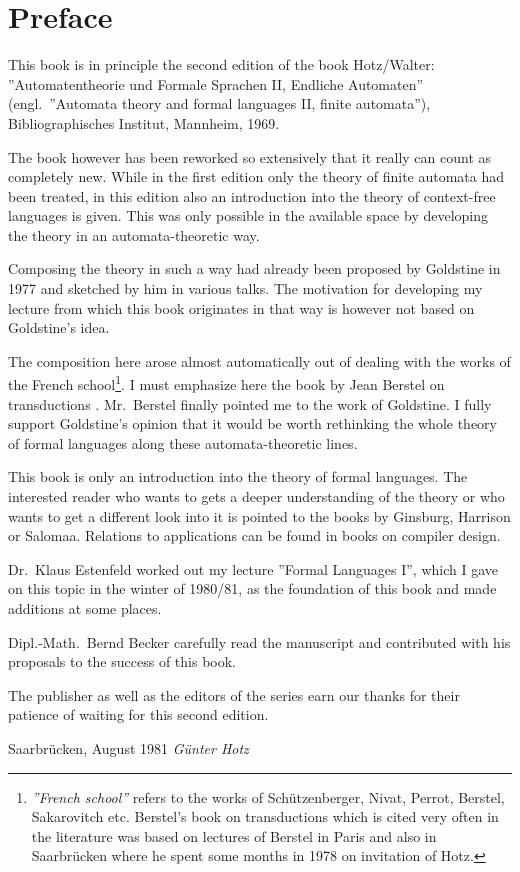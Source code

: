 \chapter*{Preface}

This book is in principle the second edition of the book Hotz/Walter:
''Automatentheorie und Formale Sprachen II, Endliche Automaten'' (engl.\
''Automata theory and formal languages II, finite automata''), Bibliographisches
Institut, Mannheim, 1969.

The book however has been reworked so extensively that it really can count as
completely new. While in the first edition only the theory of finite automata
had been treated, in this edition also an introduction into the theory of
context-free languages is given. This was only possible in the available space
by developing the theory in an automata-theoretic way.

Composing the theory in such a way had already been proposed by Goldstine in
1977 \cite{Goldstine77} and sketched by him in various talks. The motivation for
developing my lecture from which this book originates in that way is however not
based on Goldstine's idea.

The composition here arose almost automatically out of dealing with the works of
the French school\footnote{{\em ''French school''} refers to the works of
Schützenberger, Nivat, Perrot, Berstel, Sakarovitch etc. Berstel's book on
transductions which is cited very often in the literature was based on lectures 
of Berstel in Paris and also in Saarbrücken where he spent some months in 1978
on invitation of Hotz.}.
I must emphasize here the book by Jean Berstel on transductions \cite{Berstel79}. Mr.\ Berstel finally pointed me to the work of
Goldstine. I fully support Goldstine's opinion that it would be worth rethinking
the whole theory of formal languages along these automata-theoretic lines.

This book is only an introduction into the theory of formal languages. The
interested reader who wants to gets a deeper understanding of the theory or who
wants to get a different look into it is pointed to the books by Ginsburg,
Harrison or Salomaa. Relations to applications can be found in books on compiler
design.

Dr.\ Klaus Estenfeld worked out my lecture ''Formal Languages I'', which I gave
on this topic in the winter of 1980/81, as the foundation of this book and made
additions at some places.

Dipl.-Math.\ Bernd Becker carefully read the manuscript and contributed with his
proposals to the success of this book.

The publisher as well as the editors of the series earn our thanks for their
patience of waiting for this second edition.

\bigskip
Saarbrücken, August 1981 \hfill {\em Günter Hotz}
